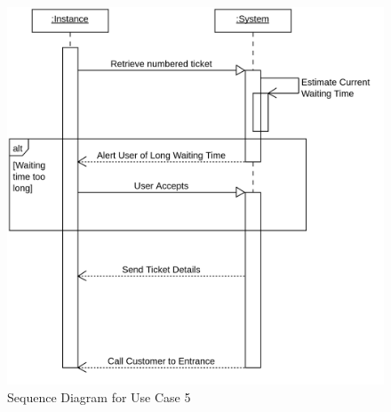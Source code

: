 \begin{figure}[H]
    \includegraphics[width=\textwidth]{Images/UML_Seq_Diag_7.png}
    \caption{\label{fig:Use_Case_Diag}Sequence Diagram for Use Case 5}
\end{figure}

